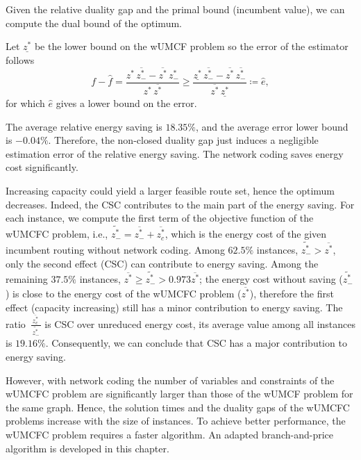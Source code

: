 Given the relative duality gap and the primal bound (incumbent value), we can compute the dual bound of the optimum.

Let \(\underline{z^*}\) be the lower bound on the wUMCF problem so the error of the estimator follows 
\begin{equation}
    f - \hat{f} = \frac{z^* \, \overline{z_{-}^*} -\overline{z^*}\, z_{-}^* }{z^* \, \overline{z^*}}  \ge \frac{\underline{z^*} \,\overline{z_{-}^*} -\overline{z^*} \, \overline{z_{-}^*} }{\overline{z^*} \,\underline{z^*}}\coloneqq \hat{e},
\end{equation}
for which \(\hat{e}\)  gives a lower bound on the error.

The average relative energy saving is \(18.35\%\), and the average error lower bound is \(-0.04\%\). Therefore, the non-closed duality gap just induces a negligible estimation error of the relative energy saving. The network coding saves energy cost significantly.

Increasing capacity could yield a larger feasible route set, hence the optimum decreases. Indeed, the CSC contributes to the main part of the energy saving. For each instance, we compute the first term of the objective function of the wUMCFC problem, i.e., \(\widetilde{z^*_{-}} =  \overline{z_{-}^*} + \overline{z_c^*}\), which is the energy cost of the given incumbent routing without network coding. Among \(62.5\%\) instances, \(\widetilde{z^*_{-}} > \overline{z^*}\), only the second effect (CSC) can contribute to energy saving. Among the remaining \(37.5\%\)  instances,  \(\overline{z^*} \ge \widetilde{z^*_{-}} > 0.973\overline{z^*}\); the energy cost without saving ($ \widetilde{z^*_{-}}$) is close to the energy cost of the wUMCFC problem ($\overline{z^*}$), therefore the first effect (capacity increasing) still has a minor contribution to energy saving. The ratio \(\,\frac{\overline{z_c^*}\,}{\,\widetilde{z^*_{-}}\,}\)  is CSC over unreduced energy cost, its average value among  all instances is \(19.16\%\). Consequently, we can conclude that CSC has a major contribution to energy saving.

However, with network coding the number of variables and constraints of the wUMCFC problem are significantly larger than those of the wUMCF problem for the same graph. Hence, the solution times and the duality gaps of the wUMCFC problems increase with the size of instances. To achieve better performance, the wUMCFC problem requires a faster algorithm. An adapted branch-and-price algorithm is developed in this chapter.

